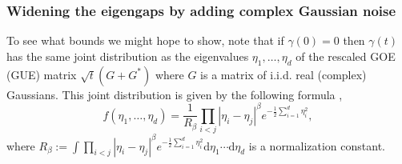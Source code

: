 \documentclass[11pt,letterpaper]{article}
\begin{document}
\subsubsection{Widening the eigengaps by adding complex Gaussian noise}
To see what bounds we might hope to show, note that if $\gamma(0) = 0$ then $\gamma(t)$ has the same joint distribution as the eigenvalues $\eta_1,\ldots, \eta_d$ of the rescaled GOE (GUE) matrix $\sqrt{t} (G+G^\ast)$ where $G$ is a matrix of i.i.d. real (complex) Gaussians.
%
This joint distribution is given by the following formula \cite{dyson1963random, ginibre1965statistical},
%
\begin{equation}\label{eq_joint_density}
    f(\eta_1,\ldots, \eta_d) = \frac{1}{R_\beta} \prod_{i<j} |\eta_i - \eta_j|^\beta e^{-\frac{1}{2} \sum_{i=1}^d \eta_i^2}, 
\end{equation}
where $R_\beta := \int \prod_{i<j} | \eta_i - \eta_j|^\beta e^{-\frac{1}{2} \sum_{i=1}^d \eta_i^2} \mathrm{d} \eta_1 \cdots \mathrm{d} \eta_d $ is a normalization constant.
\end{document}
